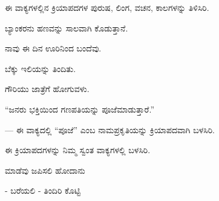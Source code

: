 \vspace{2.5pt plus 3pt minus 0.5pt}\noindent\hspace*{1.2em}\hspace{0.55em}ಈ ವಾಕ್ಯಗಳಲ್ಲಿನ ಕ್ರಿಯಾಪದಗಳ ಪುರುಷ, ಲಿಂಗ, ವಚನ, ಕಾಲಗಳನ್ನು ತಿಳಿಸಿರಿ.\par

\vspace{2.5pt plus 3pt minus 0.5pt}\noindent\hspace*{1.2em}\kbvnum{{[}ಅ{]}}\hspace{0.55em}ಬ್ಯಾಂಕರನು ಹಣವನ್ನು ಸಾಲವಾಗಿ ಕೊಡುತ್ತಾನೆ.\par

\vspace{2.5pt plus 3pt minus 0.5pt}\noindent\hspace*{1.2em}\kbvnum{{[}ಬ{]}}\hspace{0.55em}ನಾವು ಈ ದಿನ ಊರಿನಿಂದ ಬಂದೆವು.\par

\vspace{2.5pt plus 3pt minus 0.5pt}\noindent\hspace*{1.2em}\kbvnum{{[}ಕ{]}}\hspace{0.55em}ಬೆಕ್ಕು ಇಲಿಯನ್ನು ತಿಂದಿತು.\par

\vspace{2.5pt plus 3pt minus 0.5pt}\noindent\hspace*{1.2em}\kbvnum{{[}ಡ{]}}\hspace{0.55em}ಗೌರಿಯು ಜಾತ್ರೆಗೆ ಹೋಗುವಳು.\par

\vspace{2.5pt plus 3pt minus 0.5pt}\noindent\hspace*{1.2em}\hspace{0.55em}“ಜನರು ಭಕ್ತಿಯಿಂದ ಗಣಪತಿಯನ್ನು ಪೂಜೆಮಾಡುತ್ತಾರೆ.”\par

\indent — ಈ ವಾಕ್ಯದಲ್ಲಿ “ಪೂಜೆ” ಎಂಬ ನಾಮಪ್ರಕೃತಿಯನ್ನು ಕ್ರಿಯಾಪದವಾಗಿ ಬಳಸಿರಿ.\par

\vspace{2.5pt plus 3pt minus 0.5pt}\noindent\hspace*{1.2em}\hspace{0.55em}ಈ ಕ್ರಿಯಾಪದಗಳನ್ನು ನಿಮ್ಮ ಸ್ವಂತ ವಾಕ್ಯಗಳಲ್ಲಿ ಬಳಸಿರಿ.\par

\indent ಮಾಡೆವು ಜಪಿಸಲಿ ಹೋದಾನು\par

\indent - ಬರೆಯಲಿ - ತಿಂದಿರಿ ಕೊಟ್ಟಿ\par

